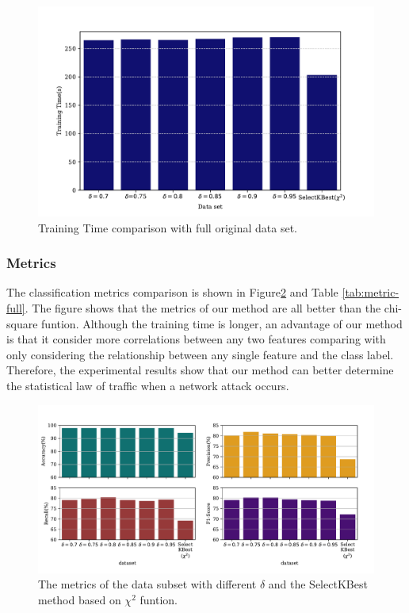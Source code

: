 \documentclass{ieeeaccess}
\theoremstyle{definition}
\begin{document}
\begin{figure}[!htpb]
    \centering
    \includegraphics[scale=0.45]{fig/training-time-chi2.pdf}
    \caption{Training Time comparison with full original data set.}
    \label{fig:training-time-with-chi2}
\end{figure}

\subsubsection{Metrics}

The classification metrics comparison is shown in Figure\ref{fig:metrics-chi2} and Table \ref{tab:metric-full}. The figure shows that the metrics of our method are all better than the chi-square funtion. Although the training time is longer, an advantage of our method is that it consider more correlations between any two features comparing with only considering the relationship between any single feature and the class label. Therefore, the experimental results show that our method can better determine the statistical law of traffic when a network attack occurs.

\begin{figure}[!htpb]
    \centering
    \includegraphics[scale=0.35]{fig/metrics-chi2.pdf}
    \caption{The metrics of the data subset with different $\delta$ and the SelectKBest method based on $\chi^2$ funtion.}
    \label{fig:metrics-chi2}
\end{figure}
\end{document}
